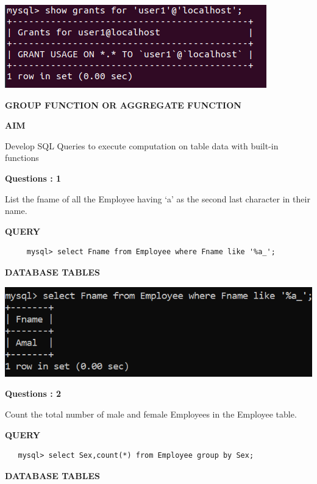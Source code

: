 \documentclass[a4paper,12pt]{report}
\begin{document}
\includegraphics[scale=0.6]{REVOKE.png}
\newpage
\begin{center}
		\large\textbf{GROUP FUNCTION OR AGGREGATE FUNCTION}
	\end{center}
	
	\begin{flushleft}
		\textbf{AIM }
	\end{flushleft} 
	   Develop SQL Queries to execute computation on table data with built-in functions
\begin{flushleft}
    \textbf{Questions : 1}
\end{flushleft}
List the fname of all the Employee having ‘a’ as the second last character in their name.	
	\begin{flushleft}
		\textbf{QUERY }
	\end{flushleft}
 \begin{verbatim}
     mysql> select Fname from Employee where Fname like '%a_';
 \end{verbatim}
\begin{flushleft}
		\textbf{DATABASE TABLES} 
\end{flushleft} 

\includegraphics[scale=0.7]{Screenshot (460).png}
\begin{flushleft}
    \textbf{Questions : 2}
\end{flushleft}
Count the total number of male and female Employees in the Employee table.
	\begin{flushleft}
		\textbf{QUERY }
	\end{flushleft}
 \begin{verbatim}
   mysql> select Sex,count(*) from Employee group by Sex;  
 \end{verbatim}
\begin{flushleft}
		\textbf{DATABASE TABLES} 
\end{flushleft} 
\end{document}
